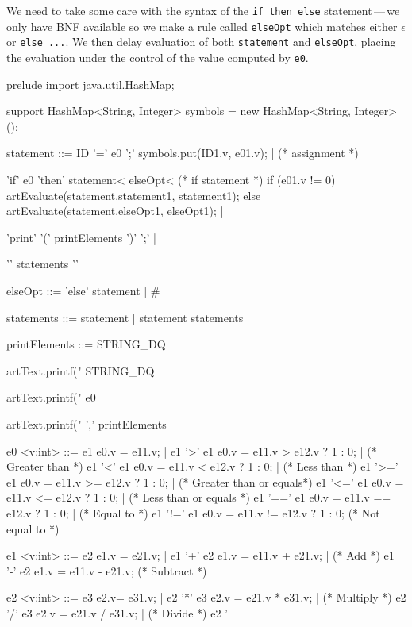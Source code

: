 We need to take some care with the syntax of the {\tt if then else} statement\,---\,we only have BNF available so we make a rule called {\tt elseOpt} which matches either $\epsilon$ or {\tt else ...}. We then delay evaluation of both {\tt statement} and {\tt elseOpt}, placing the evaluation under the control of the value computed by {\tt e0}.
\begin{codeblock}
prelude {import java.util.HashMap;}

support { HashMap<String, Integer> symbols = new HashMap<String, Integer>(); }

statement ::= ID '=' e0 ';' { symbols.put(ID1.v, e01.v); } |   (* assignment *)

              'if' e0 'then' statement< elseOpt<           (* if statement *)
              { if (e01.v != 0) 
                  artEvaluate(statement.statement1, statement1); 
                else
                  artEvaluate(statement.elseOpt1, elseOpt1);  
              } |
              
              'print' '(' printElements ')' ';' |             

              '{' statements '}'                                 

elseOpt ::= 'else' statement | #     

statements ::= statement | statement statements  

printElements ::= STRING_DQ { artText.printf("%
  STRING_DQ { artText.printf("%
  e0 { artText.printf("%
     ',' printElements  

e0 <v:int> ::= e1 { e0.v = e11.v; } | 
   e1 '>'  e1 { e0.v = e11.v >  e12.v ? 1 : 0; } |       (* Greater than *)
   e1 '<'  e1 { e0.v = e11.v <  e12.v ? 1 : 0; } |       (* Less than *)
   e1 '>=' e1 { e0.v = e11.v >= e12.v ? 1 : 0; } |       (* Greater than or equals*)
   e1 '<=' e1 { e0.v = e11.v <= e12.v ? 1 : 0; } |       (* Less than or equals *)
   e1 '==' e1 { e0.v = e11.v == e12.v ? 1 : 0; } |       (* Equal to *)
   e1 '!=' e1 { e0.v = e11.v != e12.v ? 1 : 0; }         (* Not equal to *)

e1 <v:int>  ::= e2 { e1.v = e21.v; } | 
   e1 '+' e2 { e1.v = e11.v + e21.v; } |                (* Add *)
   e1 '-' e2 { e1.v = e11.v - e21.v; }                  (* Subtract *)

e2  <v:int> ::= e3 { e2.v= e31.v; } | 
   e2 '*' e3 { e2.v = e21.v * e31.v; } |                (* Multiply *)
   e2 '/' e3 { e2.v = e21.v / e31.v; } |                (* Divide *)
   e2 '%

}}}
\end{codeblock}
